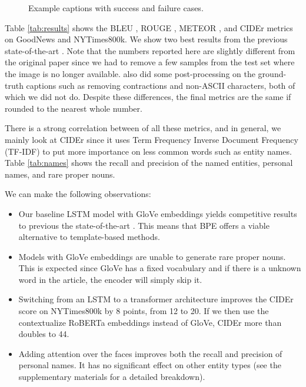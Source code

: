 \begin{figure*}[t]
   \begin{center}
   \fbox{\rule{0pt}{3in} \rule{.9\linewidth}{0pt}}
   \end{center}
      \caption{Example captions with success and failure cases.}
   \label{fig:short}
\end{figure*}


Table \ref{tab:results} shows the BLEU \cite{Papineni2002Bleu}, ROUGE
\cite{Lin2004ROUGE}, METEOR \cite{Denkowski2014Meteor}, and CIDEr
\cite{Vedantam2015CIDEr} metrics on GoodNews and NYTimes800k. We show two best
results from the previous state-of-the-art \cite{Biten2019GoodNews}. Note that
the numbers reported here are slightly different from the original paper since
we had to remove a few samples from the test set where the image is no longer
available. \cite{Biten2019GoodNews} also did some post-processing on the
ground-truth captions such as removing contractions and non-ASCII characters,
both of which we did not do. Despite these differences, the final metrics
are the same if rounded to the nearest whole number.

There is a strong correlation between of all these metrics, and in general, we
mainly look at CIDEr since it uses Term Frequency Inverse Document Frequency
(TF-IDF) to put more importance on less common words such as entity names.
Table \ref{tab:names} shows the recall and precision of the named entities,
personal names, and rare proper nouns.

We can make the following observations:

\begin{itemize}
   \item Our baseline LSTM model with GloVe embeddings yields competitive
   results to previous the state-of-the-art \cite{Biten2019GoodNews}. This
   means that BPE offers a viable alternative to template-based methods.

   \item Models with GloVe embeddings are unable to generate rare proper nouns.
   This is expected since GloVe has a fixed vocabulary and if there is a
   unknown word in the article, the encoder will simply skip it.

   \item Switching from an LSTM to a transformer architecture improves the
   CIDEr score on NYTimes800k by 8 points, from 12 to 20. If we then use the
   contextualize RoBERTa embeddings instead of GloVe, CIDEr more than doubles
   to 44.

   \item Adding attention over the faces improves both the recall and precision
   of personal names. It has no significant effect on other entity types (see
   the supplementary materials for a detailed breakdown).
\end{itemize}


